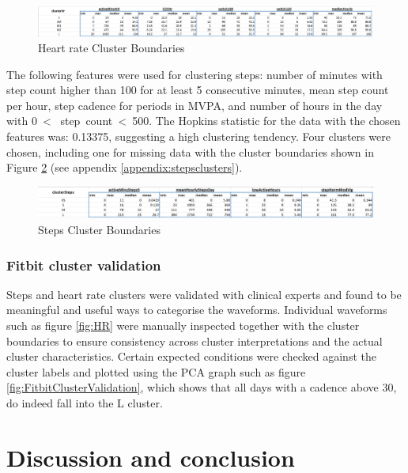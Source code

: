 \documentclass{article}
\begin{document}
\begin{figure}[H]
  \centering
  \includegraphics[scale=0.5]{hr_cluster_boundaries.png}
  \caption{Heart rate Cluster Boundaries}
  \label{fig:hrBoundaries}
\end{figure}


The following features were used for clustering steps: number of minutes with step count higher than 100 for at least 5 consecutive minutes, mean step count per hour, step cadence for periods in MVPA, and number of hours in the day with 0~< ~step~count~<~500. The Hopkins statistic for the data with the chosen features was: 0.13375, suggesting a high clustering tendency. Four clusters were chosen, including one for missing data with the cluster boundaries shown in Figure \ref{fig:stepsBoundaries} (see appendix \ref{appendix:stepsclusters}).

\begin{figure}[H]
  \centering
  \includegraphics[scale=0.5]{steps_cluster_boundaries.png}
  \caption{Steps Cluster Boundaries}
  \label{fig:stepsBoundaries}
\end{figure}


\subsubsection{Fitbit cluster validation }

Steps and heart rate clusters were validated with clinical experts and found to be meaningful and useful ways to categorise the waveforms. Individual waveforms such as figure \ref{fig:HR} were manually inspected together with the cluster boundaries to ensure consistency across cluster interpretations and the actual cluster characteristics. Certain expected conditions were checked against the cluster labels and plotted using the PCA graph such as figure \ref{fig:FitbitClusterValidation}, which shows that all days with a cadence above 30, do indeed fall into the L cluster. 

\section{Discussion and conclusion} 
\end{document}
